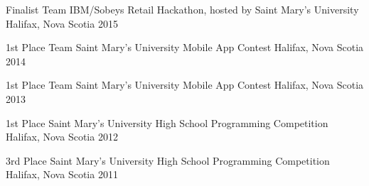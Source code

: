 



\begin{cvhonors}

  \cvhonor
    {Finalist Team} %
    {IBM/Sobeys Retail Hackathon, hosted by Saint Mary's University} %
    {Halifax, Nova Scotia} %
    {2015} %

  \cvhonor
    {1st Place Team} %
    {Saint Mary's University Mobile App Contest} %
    {Halifax, Nova Scotia} %
    {2014} %

  \cvhonor
    {1st Place Team} %
    {Saint Mary's University Mobile App Contest} %
    {Halifax, Nova Scotia} %
    {2013} %

  \cvhonor
    {1st Place} %
    {Saint Mary's University High School Programming Competition} %
    {Halifax, Nova Scotia} %
    {2012} %

  \cvhonor
    {3rd Place} %
    {Saint Mary's University High School Programming Competition} %
    {Halifax, Nova Scotia} %
    {2011} %

\end{cvhonors}
